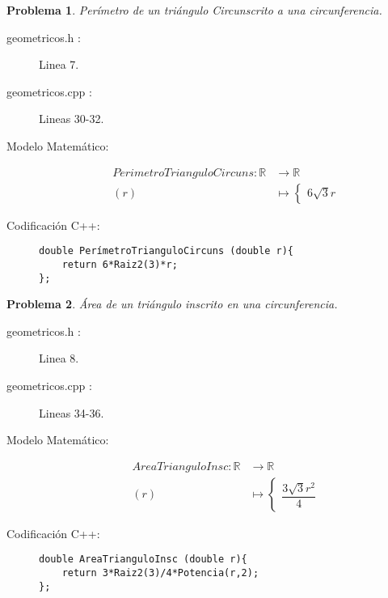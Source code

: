 \documentclass{article}
\theoremstyle{plain}
\theoremstyle{definition}
\newtheorem{problem}{Problema}
\begin{document}
\begin{problem} \emph{Perímetro de un triángulo Circunscrito a una circunferencia.}\\
\begin{description}
\item[geometricos.h :] Linea 7. \item[geometricos.cpp :] Lineas 30-32.

\item[Modelo Matemático:]
\begin{align*}
PerimetroTrianguloCircuns: \mathbb{R} &\to \mathbb{R}\\
(r) &\mapsto \begin{cases}
6\sqrt{3}r
\end{cases}
\end{align*}
%
\item[Codificación \textsf{C++}:]\hfill
%
\begin{verbatim}
double PerímetroTrianguloCircuns (double r){
    return 6*Raiz2(3)*r;
};
\end{verbatim}
\end{description}
\end{problem}

\begin{problem} \emph{Área de un triángulo inscrito en una circunferencia.}\\
\begin{description}
\item[geometricos.h :] Linea 8. \item[geometricos.cpp :] Lineas 34-36.

\item[Modelo Matemático:]
\begin{align*}
AreaTrianguloInsc: \mathbb{R} &\to \mathbb{R}\\
(r) &\mapsto \begin{cases}
\dfrac{3\sqrt{3}r^{2}}{4}
\end{cases}
\end{align*}
%
\item[Codificación \textsf{C++}:]\hfill
%
\begin{verbatim}
double AreaTrianguloInsc (double r){
    return 3*Raiz2(3)/4*Potencia(r,2);
};
\end{verbatim}
\end{description}
\end{problem}
\end{document}
